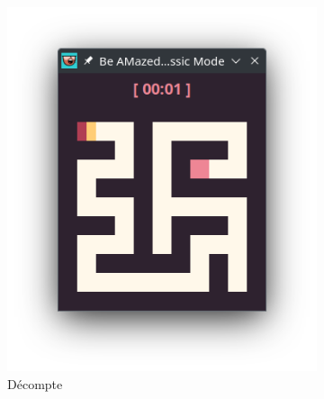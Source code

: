 \begin{figure}[!htb]
    \hfill
    \begin{subfigure}[b]{0.3\textwidth}
        \includegraphics[width=\textwidth]{ressources/Implementation/Labyrinthe/Vue/CountdownTimer/CountDown.png}
        \caption{Décompte}
    \end{subfigure}
    \hfill
    \begin{subfigure}[b]{0.3\textwidth}

\end{subfigure}
\end{figure}

